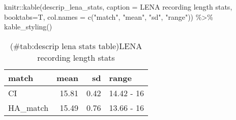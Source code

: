 \documentclass[
]{article}
\newenvironment{Shaded}{\begin{snugshade}}{\end{snugshade}}
\newcommand{\AttributeTok}[1]{\textcolor[rgb]{0.77,0.63,0.00}{#1}}
\newcommand{\FunctionTok}[1]{\textcolor[rgb]{0.00,0.00,0.00}{#1}}
\newcommand{\NormalTok}[1]{#1}
\newcommand{\SpecialCharTok}[1]{\textcolor[rgb]{0.00,0.00,0.00}{#1}}
\newcommand{\StringTok}[1]{\textcolor[rgb]{0.31,0.60,0.02}{#1}}
\begin{document}
\begin{Shaded}
\begin{Highlighting}[]
\NormalTok{knitr}\SpecialCharTok{::}\FunctionTok{kable}\NormalTok{(descrip\_lena\_stats, }\AttributeTok{caption =} \StringTok{\textquotesingle{}LENA recording length stats\textquotesingle{}}\NormalTok{, }
             \AttributeTok{booktabs=}\NormalTok{T,}
             \AttributeTok{col.names =} \FunctionTok{c}\NormalTok{(}\StringTok{"match"}\NormalTok{, }\StringTok{"mean"}\NormalTok{, }\StringTok{"sd"}\NormalTok{, }\StringTok{"range"}\NormalTok{)) }\SpecialCharTok{\%\textgreater{}\%} 
  \FunctionTok{kable\_styling}\NormalTok{()}
\end{Highlighting}
\end{Shaded}

\begin{table}

\caption{(\#tab:descrip lena stats table)LENA recording length stats}
\centering
\begin{tabular}[t]{lrrl}
\toprule
match & mean & sd & range\\
\midrule
CI & 15.81 & 0.42 & 14.42 - 16\\
HA\_match & 15.49 & 0.76 & 13.66 - 16\\
\bottomrule
\end{tabular}
\end{table}
\end{document}
